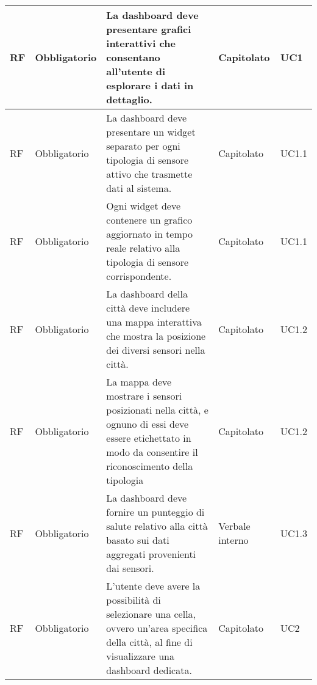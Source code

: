 \begin{longtable}{|C{1cm}|C{2cm}|>{\raggedright}m{5cm}|C{2cm}|C{1.5cm}|}
    \hline
     RF & Obbligatorio        & La dashboard deve presentare grafici interattivi che consentano all'utente di esplorare i dati in dettaglio.                                                                                                                       & Capitolato      & UC1               \\
    \hline
     RF & Obbligatorio        & La dashboard deve presentare un widget separato per ogni tipologia di sensore attivo che trasmette dati al sistema.                                                                                                                & Capitolato      & UC1.1               \\
    \hline
     RF & Obbligatorio        & Ogni widget deve contenere un grafico aggiornato in tempo reale relativo alla tipologia di sensore corrispondente.                                                                                                                 & Capitolato      & UC1.1               \\
    \hline
     RF & Obbligatorio        & La dashboard della città deve includere una mappa interattiva che mostra la posizione dei diversi sensori nella città.                                                                                                             & Capitolato      & UC1.2                   \\
    \hline
     RF & Obbligatorio        & La mappa deve mostrare i sensori posizionati nella città, e ognuno di essi deve essere etichettato in modo da consentire il riconoscimento della tipologia                                                                         & Capitolato      & UC1.2               \\
    \hline
     RF & Obbligatorio        & La dashboard deve fornire un punteggio di salute relativo alla città basato sui dati aggregati provenienti dai sensori.                                                                                                            & Verbale interno & UC1.3                    \\
    \hline
    \hline
     RF & Obbligatorio        & L'utente deve avere la possibilità di selezionare una cella, ovvero un'area specifica della città, al fine di visualizzare una dashboard dedicata.& Capitolato      & UC2              \\

\end{longtable}
